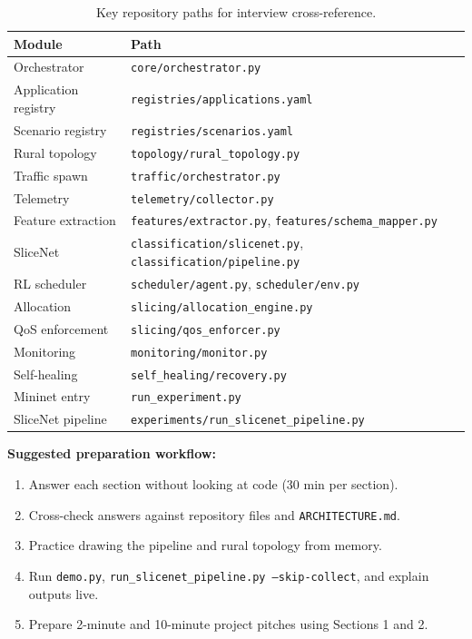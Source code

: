 \documentclass[11pt,a4paper]{article}
\begin{document}
\begin{table}[h]
\centering
\small
\begin{tabular}{@{}ll@{}}
\toprule
\textbf{Module} & \textbf{Path} \\
\midrule
Orchestrator & \texttt{core/orchestrator.py} \\
Application registry & \texttt{registries/applications.yaml} \\
Scenario registry & \texttt{registries/scenarios.yaml} \\
Rural topology & \texttt{topology/rural\_topology.py} \\
Traffic spawn & \texttt{traffic/orchestrator.py} \\
Telemetry & \texttt{telemetry/collector.py} \\
Feature extraction & \texttt{features/extractor.py}, \texttt{features/schema\_mapper.py} \\
SliceNet & \texttt{classification/slicenet.py}, \texttt{classification/pipeline.py} \\
RL scheduler & \texttt{scheduler/agent.py}, \texttt{scheduler/env.py} \\
Allocation & \texttt{slicing/allocation\_engine.py} \\
QoS enforcement & \texttt{slicing/qos\_enforcer.py} \\
Monitoring & \texttt{monitoring/monitor.py} \\
Self-healing & \texttt{self\_healing/recovery.py} \\
Mininet entry & \texttt{run\_experiment.py} \\
SliceNet pipeline & \texttt{experiments/run\_slicenet\_pipeline.py} \\
\bottomrule
\end{tabular}
\caption{Key repository paths for interview cross-reference.}
\end{table}

\vspace{1em}
\noindent\textbf{Suggested preparation workflow:}
\begin{enumerate}[noitemsep]
    \item Answer each section without looking at code (30 min per section).
    \item Cross-check answers against repository files and \texttt{ARCHITECTURE.md}.
    \item Practice drawing the pipeline and rural topology from memory.
    \item Run \texttt{demo.py}, \texttt{run\_slicenet\_pipeline.py --skip-collect}, and explain outputs live.
    \item Prepare 2-minute and 10-minute project pitches using Sections 1 and 2.
\end{enumerate}
\end{document}
